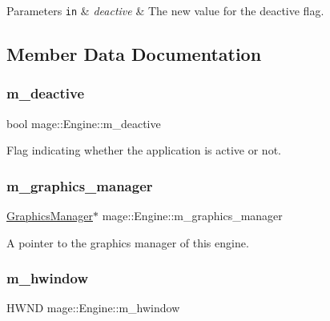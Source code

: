 \begin{DoxyParams}[1]{Parameters}
\mbox{\tt in}  & {\em deactive} & The new value for the deactive flag. \\
\hline
\end{DoxyParams}


\subsection{Member Data Documentation}
\hypertarget{classmage_1_1_engine_ab8a4b0157403708ae7d1d018a95b4c63}{}\label{classmage_1_1_engine_ab8a4b0157403708ae7d1d018a95b4c63} 
\subsubsection{\texorpdfstring{m\+\_\+deactive}{m\_deactive}}
{\footnotesize\ttfamily bool mage\+::\+Engine\+::m\+\_\+deactive\hspace{0.3cm}{\ttfamily [private]}}

Flag indicating whether the application is active or not. \hypertarget{classmage_1_1_engine_aa023fed16396e4730d525df547a5687b}{}\label{classmage_1_1_engine_aa023fed16396e4730d525df547a5687b} 
\subsubsection{\texorpdfstring{m\+\_\+graphics\+\_\+manager}{m\_graphics\_manager}}
{\footnotesize\ttfamily \hyperlink{classmage_1_1_graphics_manager}{Graphics\+Manager}$\ast$ mage\+::\+Engine\+::m\+\_\+graphics\+\_\+manager\hspace{0.3cm}{\ttfamily [private]}}

A pointer to the graphics manager of this engine. \hypertarget{classmage_1_1_engine_a1dda09f0ed656180f926616a0d3f95f1}{}\label{classmage_1_1_engine_a1dda09f0ed656180f926616a0d3f95f1} 
\subsubsection{\texorpdfstring{m\+\_\+hwindow}{m\_hwindow}}
{\footnotesize\ttfamily H\+W\+ND mage\+::\+Engine\+::m\+\_\+hwindow\hspace{0.3cm}{\ttfamily [private]}}

